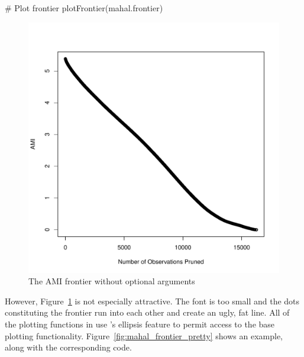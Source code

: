 \documentclass[nojss]{jss}
\begin{document}
\begin{minipage}{0.45\textwidth}
\begin{CodeChunk}
\begin{CodeInput}
# Plot frontier
plotFrontier(mahal.frontier)
\end{CodeInput}
\end{CodeChunk}
\end{minipage}
\begin{minipage}{0.5\textwidth}
\begin{figure}[H]
\includegraphics{mahal_frontier_plain.pdf}
\caption{\label{fig:mahal_frontier_plain} The AMI frontier without optional arguments}
\end{figure}
\end{minipage} \hfill
\newline
\newline

However, Figure~\ref{fig:mahal_frontier_plain} is not especially
attractive.  The font is too small and the dots constituting the
frontier run into each other and create an ugly, fat line. All of the
plotting functions in  use 's
ellipsis feature to permit access to the base plotting
functionality. Figure~\ref{fig:mahal_frontier_pretty} shows an
example, along with the corresponding code.
\end{document}
